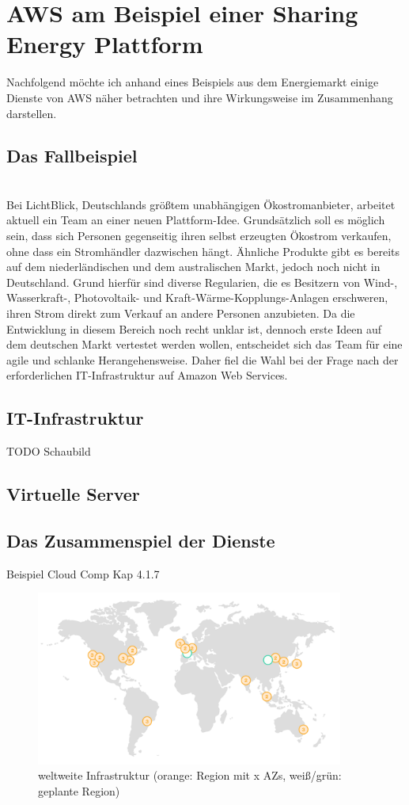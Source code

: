 \chapter{AWS am Beispiel einer Sharing Energy Plattform}\label{chapter:kapitellabel} %
Nachfolgend möchte ich anhand eines Beispiels aus dem Energiemarkt einige Dienste von AWS näher betrachten und ihre Wirkungsweise im Zusammenhang darstellen.

\section{Das Fallbeispiel}
\label{sec:fallbeispiel}
\\ Bei LichtBlick, Deutschlands größtem unabhängigen Ökostromanbieter, arbeitet aktuell ein Team an einer neuen Plattform-Idee. Grundsätzlich soll es möglich sein, dass sich Personen gegenseitig ihren selbst erzeugten Ökostrom verkaufen, ohne dass ein Stromhändler dazwischen hängt. Ähnliche Produkte gibt es bereits auf dem niederländischen und dem australischen Markt, jedoch noch nicht in Deutschland. Grund hierfür sind diverse Regularien, die es Besitzern von Wind-, Wasserkraft-, Photovoltaik- und Kraft-Wärme-Kopplungs-Anlagen erschweren, ihren Strom direkt zum Verkauf an andere Personen anzubieten. Da die Entwicklung in diesem Bereich noch recht unklar ist, dennoch erste Ideen auf dem deutschen Markt vertestet werden wollen, entscheidet sich das Team für eine agile und schlanke Herangehensweise. Daher fiel die Wahl bei der Frage nach der erforderlichen IT-Infrastruktur auf Amazon Web Services.


\section{IT-Infrastruktur}
\label{sec:infrastruktur}

TODO Schaubild

\section{Virtuelle Server}

\cite{aws:general}

\section{Das Zusammenspiel der Dienste}
\label{sec:spiel}
Beispiel Cloud Comp Kap 4.1.7

\begin{figure}[!ht]
  \centering
  \includegraphics[width=0.9\textwidth]{images/regions.png}
  \caption{weltweite Infrastruktur (orange: Region mit x AZs, weiß/grün: geplante Region) \cite{aws:regions}}
\end{figure}


